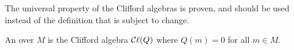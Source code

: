 \begin{remark}
  \label{mk:univ}

The universal property of the Clifford algebras is proven, and should be used instead of the definition
that is subject to change.

\end{remark}

\begin{definition}
  \label{ExteriorAlgebra}
  \leanok

  An  over $M$ is the Clifford algebra $\mathop{\mathcal{C}\ell}(Q)$ where $Q(m) = 0$ for all $m \in M$.

\end{definition}